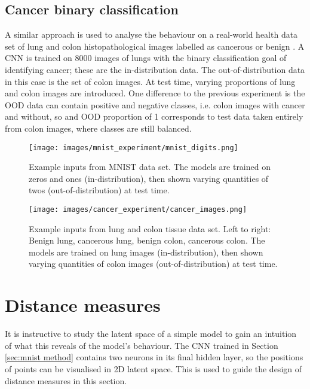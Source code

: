 \documentclass{article}
\begin{document}
\subsection{Cancer binary classification}
\label{sec:cancer method}
A similar approach is used to analyse the behaviour on a real-world health data set of lung and colon histopathological images labelled as cancerous or benign \cite{borkowski_lung_colon}. A CNN is trained on 8000 images of lungs with the binary classification goal of identifying cancer; these are the in-distribution data. The out-of-distribution data in this case is the set of colon images. At test time, varying proportions of lung and colon images are introduced. One difference to the previous experiment is the OOD data can contain positive and negative classes, i.e. colon images with cancer and without, so and OOD proportion of 1 corresponds to test data taken entirely from colon images, where classes are still balanced.


\begin{figure}
  \centering
  \texttt{[image: images/mnist\_experiment/mnist\_digits.png]}
  \caption{Example inputs from MNIST data set. The models are trained on zeros and ones (in-distribution), then shown varying quantities of twos (out-of-distribution) at test time.}
  \label{mnist_inputs_image}
\end{figure}

\begin{figure}
  \centering
  \texttt{[image: images/cancer\_experiment/cancer\_images.png]}
  \caption{Example inputs from lung and colon tissue data set. Left to right: Benign lung, cancerous lung, benign colon, cancerous colon. The models are trained on lung images (in-distribution), then shown varying quantities of colon images (out-of-distribution) at test time.}
  \label{cancer_inputs_image}
\end{figure}



\section{Distance measures}
\label{sec:distance measures}
It is instructive to study the latent space of a simple model to gain an intuition of what this reveals of the model's behaviour. The CNN trained in Section \ref{sec:mnist method} contains two neurons in its final hidden layer, so the positions of points can be visualised in 2D latent space. This is used to guide the design of distance measures in this section.
\end{document}
